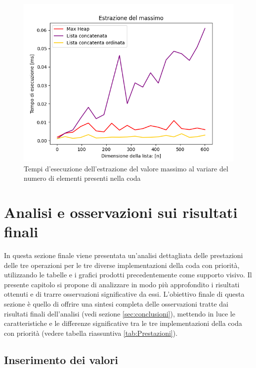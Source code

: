 \documentclass{article}
\begin{document}
\begin{figure}[h]
    \includegraphics[width=\textwidth]{Images/GraficoEstMassimo.png}
    \centering
    \caption{Tempi d'esecuzione dell'estrazione del valore massimo al variare del numero di elementi presenti nella coda}
    \label{fig:GraficoEstrazione}
\end{figure}

\clearpage

\section{Analisi e osservazioni sui risultati finali}

\label{sec:osservazioniFinali}

In questa sezione finale viene presentata un'analisi dettagliata delle prestazioni delle tre operazioni per le tre diverse implementazioni della coda con priorità, utilizzando le tabelle e i grafici prodotti precedentemente come supporto visivo. Il presente capitolo si propone di analizzare in modo più approfondito i risultati ottenuti e di trarre osservazioni significative da essi. L'obiettivo finale di questa sezione è quello di offrire una sintesi completa delle osservazioni tratte dai risultati finali dell'analisi (vedi sezione \ref{sec:conclusioni}), mettendo in luce le caratteristiche e le differenze significative tra le tre implementazioni della coda con priorità (vedere tabella riassuntiva \ref{tab:Prestazioni}).

\subsection{Inserimento dei valori}
\end{document}
